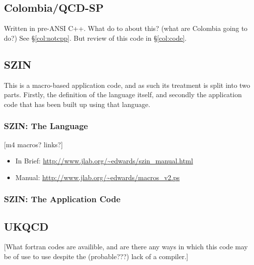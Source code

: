 \documentclass[12pt]{article}
\begin{document}
\subsection{Colombia/QCD-SP}
Written in pre-ANSI C++.  What do to about this? (what are Colombia
going to do?)  See \S\ref{col:notcpp}. But review of this code in
\S\ref{col:code}. 

\subsection{SZIN}
This is a macro-based application code, and as such its treatment is
split into two parts.  Firstly, the definition of the language itself,
and secondly the application code that has been built up using that language.

\subsubsection{SZIN: The Language }
[m4 macros? links?]

\begin{itemize}
\item In Brief:
        \href{http://www.jlab.org/~edwards/szin_manual.html}
        {http://www.jlab.org/{\textasciitilde}edwards/szin\_manual.html}
\item Manual:
        \href{http://www.jlab.org/~edwards/macros_v2.ps}
        {http://www.jlab.org/{\textasciitilde}edwards/macros\_v2.ps}
\end{itemize}

\subsubsection{SZIN: The Application Code}

\subsection{UKQCD}
[What fortran codes are availible, and are there any ways in which
this code may be of use to use despite the (probable???) lack of a
compiler.] 

\end{document}
